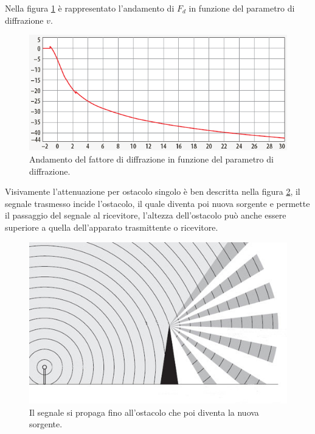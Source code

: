 Nella figura \ref{img:fd} è rappresentato l'andamento di $F_{d}$ in funzione del parametro di diffrazione $v$. \\
\begin{figure}[!h]
\centering
\includegraphics[height=0.5\textwidth]{Immagini/pathloss}
\caption{Andamento del fattore di diffrazione in funzione del parametro di diffrazione.}
\label{img:fd}
\end{figure}
Visivamente l'attenuazione per ostacolo singolo è ben descritta nella figura \ref{img:knifeedgeeffect}, il segnale trasmesso incide 
l'ostacolo, il quale diventa poi nuova sorgente e permette il passaggio del segnale al ricevitore, l'altezza dell'ostacolo può anche 
essere superiore a quella dell'apparato trasmittente o ricevitore.
\begin{figure}[!h]
\centering
\includegraphics[height=0.5\textwidth]{Immagini/knifeedgeeffect}
\caption{Il segnale si propaga fino all'ostacolo che poi diventa la nuova sorgente.}
\label{img:knifeedgeeffect}
\end{figure}

